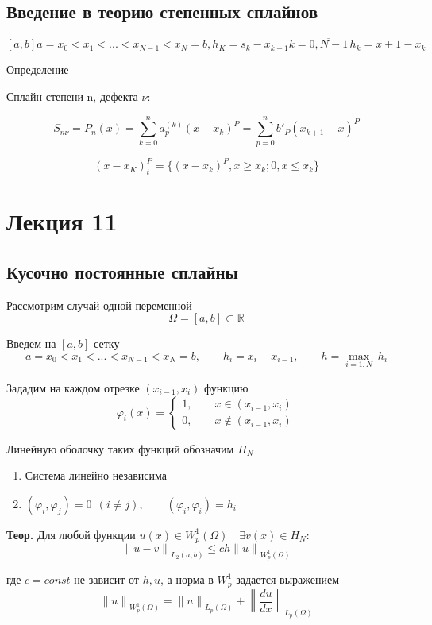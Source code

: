 \documentclass[12pt, a4paper]{article}
\newcommand{\Sum}{\sum\limits}
\begin{document}
\subsection{Введение в теорию степенных сплайнов}

\[ [a, b] a = x_0 < x_1 < ... < x_{N-1} < x_N = b, h_K = s_k - x_{k-1} k = \overline{0, N-1}\, h_k = x+1 - x_k\]

Определение

Сплайн степени n, дефекта $ \nu $:

\[ S_{n\nu} = P_n (x) = \Sum_{k=0}^{n} a_p^(k) (x-x_k)^P = \Sum_{p = 0}^{n} {b'}_P{(x_{k+1} - x)}^P \]

\[ (x - x_K)^P_t = \{ (x - x_k)^P, x \geq x_k; 0, x \leq x_k \} \]

\newpage

\section{Лекция 11}

\subsection{Кусочно постоянные сплайны}

Рассмотрим случай одной переменной
\[ \Omega = [a, b] \subset \mathbb{R} \]

Введем на $[a, b]$ сетку 
\[ a = x_0 < x_1 < ... < x_{N-1} < x_N = b, \qquad h_i = x_i - x_{i-1}, \qquad h = \underset{i=1, N}{\max} \ h_i \]

Зададим на каждом отрезке $(x_{i-1}, x_i)$ функцию
\[ \varphi_i (x) =  \left\{ \begin{array}{l}
	1, \qquad x \in (x_{i-1}, x_i) \\
	0, \qquad x \not \in (x_{i-1}, x_i)
\end{array} \right. \]

Линейную оболочку таких функций обозначим $H_N$

\begin{enumerate}
	\item Система линейно независима
	\item $ (\varphi_i, \varphi_j) = 0 \ \ (i \neq j), \qquad (\varphi_i, \varphi_i) = h_i $
\end{enumerate}

\textbf{Теор.} Для любой функции $u(x) \in W_p^1 (\Omega) \quad \exists v(x) \in H_N$:
\[ {\| u - v \|}_{L_2(a,b)} \leq c h {\|u\|}_{W_p^1 (\Omega)} \]

где $c = const$ не зависит от $h, u$, а норма в $W_p^1$ задается выражением
\[ {\|u\|}_{W_p^1(\Omega)} = {\|u\|}_{L_p (\Omega)} + {\left\| \frac{du}{dx} \right\|}_{L_p (\Omega)} \]
\end{document}
